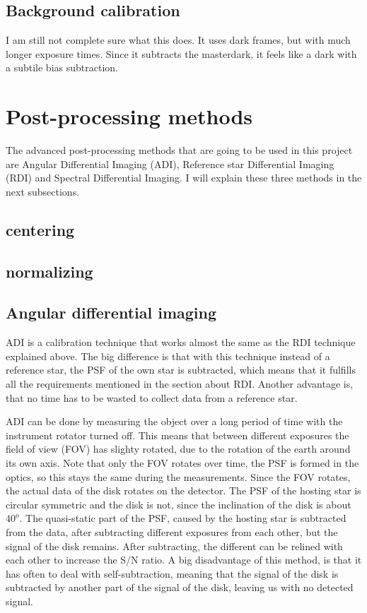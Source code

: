 \documentclass[twoside,single]{lion-msc}
\begin{document}
\subsection{Background calibration}
I am still not complete sure what this does. It uses dark frames, but with much longer exposure times. Since it subtracts the masterdark, it feels like a dark with a subtile bias subtraction.

\section{Post-processing methods}
The advanced post-processing methods that are going to be used in this project are Angular Differential Imaging (ADI), Reference star Differential Imaging (RDI) and Spectral Differential Imaging. I will explain these three methods in the next subsections.

\subsection{centering}

\subsection{normalizing}

\subsection{Angular differential imaging}
ADI is a calibration technique that works almost the same as the RDI technique explained above. The big difference is that with this technique instead of a reference star, the PSF of the own star is subtracted, which means that it fulfills all the requirements mentioned in the section about RDI. Another advantage is, that no time has to be wasted to collect data from a reference star. 
\bigskip

ADI can be done by measuring the object over a long period of time with the instrument rotator turned off. This means that between different exposures the field of view (FOV) has slighty rotated, due to the rotation of the earth around its own axis. Note that only the FOV rotates over time, the PSF is formed in the optics, so this stays the same during the measurements. Since the FOV rotates, the actual data of the disk rotates on the detector. The PSF of the hosting star is circular symmetric and the disk is not, since the inclination of the disk is about $40^o$. The quasi-static part of the PSF, caused by the hosting star is subtracted from the data, after subtracting different exposures from each other, but the signal of the disk remains. After subtracting, the different can be relined with each other to increase the S/N ratio. A big disadvantage of this method, is that it has often to deal with self-subtraction, meaning that the signal of the disk is subtracted by another part of the signal of the disk, leaving us with no detected signal. \cite{Marois2005} 
\end{document}
